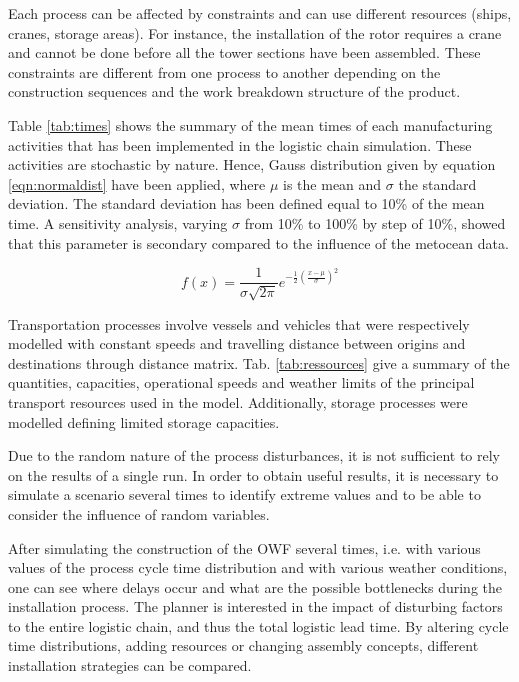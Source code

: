 Each process can be affected by constraints and can use different resources (ships, cranes, storage areas). For instance, the installation of the rotor requires a crane and cannot be done before all the tower sections have been assembled. These constraints are different from one process to another depending on the construction sequences and the work breakdown structure of the product.

Table \ref{tab:times} shows the summary of the mean times of each manufacturing activities that has been implemented in the logistic chain simulation. These activities are stochastic by nature. Hence, Gauss distribution given by equation \ref{eqn:normaldist} have been applied, where $\mu$ is the mean and $\sigma$ the standard deviation. The standard deviation has been defined equal to 10\% of the mean time. A sensitivity analysis, varying $\sigma$ from 10\% to 100\% by step of 10\%, showed that this parameter is secondary compared to the influence of the metocean data. 

\begin{equation}
\label{eqn:normaldist}
f\left( x \right) = \frac{1}{\sigma \sqrt{2 \pi} } e^{- \frac{1}{2} \left( \frac{x - \mu}{\sigma} \right)^{2}}
\end{equation}

Transportation processes involve vessels and vehicles that were respectively modelled with constant speeds and travelling distance between origins and destinations through distance matrix. Tab. \ref{tab:ressources} give a summary of the quantities, capacities, operational speeds and weather limits of the principal transport resources used in the model. Additionally, storage processes were modelled defining limited storage capacities.

Due to the random nature of the process disturbances, it is not sufficient to rely on the results of a single run. In order to obtain useful results, it is necessary to simulate a scenario several times to identify extreme values and to be able to consider the influence of random variables.

After simulating the construction of the OWF several times, i.e. with various values of the process cycle time distribution and with various weather conditions, one can see where delays occur and what are the possible bottlenecks during the installation process. The planner is interested in the impact of disturbing factors to the entire logistic chain, and thus the total logistic lead time. By altering cycle time distributions, adding resources or changing assembly concepts, different installation strategies can be compared.